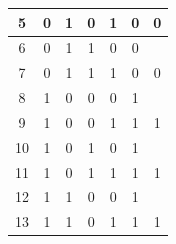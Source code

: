 \begin{center}
\begin{tabular}{ccccccc}
\multicolumn{1}{c|}{5}                           & 0                         & 1                         & 0                         & \multicolumn{1}{c|}{1}                         & \multicolumn{1}{c|}{0}                             & \multirow{-2}{*}{0}   \\ \hline
\multicolumn{1}{c|}{6}                           & 0                         & 1                         & 1                         & \multicolumn{1}{c|}{0}                         & \multicolumn{1}{c|}{0}                             &                       \\
\multicolumn{1}{c|}{7}                           & 0                         & 1                         & 1                         & \multicolumn{1}{c|}{1}                         & \multicolumn{1}{c|}{0}                             & \multirow{-2}{*}{0}   \\ \hline
\multicolumn{1}{c|}{8}                           & 1                         & 0                         & 0                         & \multicolumn{1}{c|}{0}                         & \multicolumn{1}{c|}{1}                             &                       \\
\multicolumn{1}{c|}{9}                           & 1                         & 0                         & 0                         & \multicolumn{1}{c|}{1}                         & \multicolumn{1}{c|}{1}                             & \multirow{-2}{*}{1}   \\ \hline
\multicolumn{1}{c|}{10}                          & 1                         & 0                         & 1                         & \multicolumn{1}{c|}{0}                         & \multicolumn{1}{c|}{1}                             &                       \\
\multicolumn{1}{c|}{11}                          & 1                         & 0                         & 1                         & \multicolumn{1}{c|}{1}                         & \multicolumn{1}{c|}{1}                             & \multirow{-2}{*}{1}   \\ \hline
\multicolumn{1}{c|}{12}                          & 1                         & 1                         & 0                         & \multicolumn{1}{c|}{0}                         & \multicolumn{1}{c|}{1}                             &                       \\
\multicolumn{1}{c|}{13}                          & 1                         & 1                         & 0                         & \multicolumn{1}{c|}{1}                         & \multicolumn{1}{c|}{1}                             & \multirow{-2}{*}{1}   \\ \hline

\end{tabular}
\end{center}
